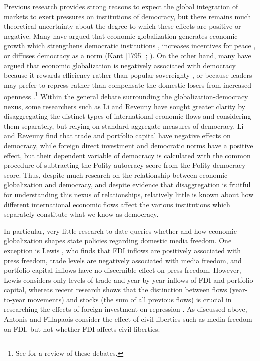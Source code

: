\documentclass[12pt,a4paper]{article}\usepackage[]{graphicx}\usepackage[]{color}
\begin{document}
Previous research provides strong reasons to expect the global integration of markets to exert pressures on institutions of democracy, but there remains much theoretical uncertainty about the degree to which these effects are positive or negative. Many have argued that economic globalization generates economic growth which strengthens democratic institutions \parencites{Baghwati:1997vy}{Im:1996cl}, increases incentives for peace \parencites{Baghwati:1997vy}{Oneal:1999fc}, or diffuses democracy as a norm (Kant [1795] \cite*{Kant:1983uf}; \cite{Limongi:1996dr}). On the other hand, many have argued that economic globalization is negatively associated with democracy because it rewards efficiency rather than popular sovereignty \parencites{Huntington:1975vt}{Lindblom:1977ue}{Cammack:1998gf}, or because leaders may prefer to repress rather than compensate the domestic losers from increased openness \parencite{Adsera:2002vt}.\footnote{See \cite{Milner:2009hi} for a review of these debates.} Within the general debate surrounding the globalization-democracy nexus, some researchers such as Li and Reveuny \parencite*{Li:2003vj} have sought greater clarity by disaggregating the distinct types of international economic flows and considering them separately, but relying on standard aggregate measures of democracy. Li and Reveuny find that trade and portfolio capital have negative effects on democracy, while foreign direct investment and democratic norms have a positive effect, but their dependent variable of democracy is calculated with the common procedure of subtracting the Polity autocracy score from the Polity democracy score. Thus, despite much research on the relationship between economic globalization and democracy, and despite evidence that disaggregation is fruitful for understanding this nexus of relationships, relatively little is known about how different international economic flows affect the various institutions which separately constitute what we know as democracy.

In particular, very little research to date queries whether and how economic globalization shapes state policies regarding domestic media freedom. One exception is Lewis \parencite*{Lewis:qDvYbWlU}, who finds that FDI inflows are positively associated with press freedom, trade levels are negatively associated with media freedom, and portfolio capital inflows have no discernible effect on press freedom. However, Lewis considers only levels of trade and year-by-year inflows of FDI and portfolio capital, whereas recent research shows that the distinction between flows (year-to-year movements) and stocks (the sum of all previous flows) is crucial in researching the effects of foreign investment on repression \parencite{Sorens:2012hc}. As discussed above, Antonis and Fillapaois \parencite*{Adam:2007gn} consider the effect of civil liberties such as media freedom on FDI, but not whether FDI affects civil liberties.
\end{document}
